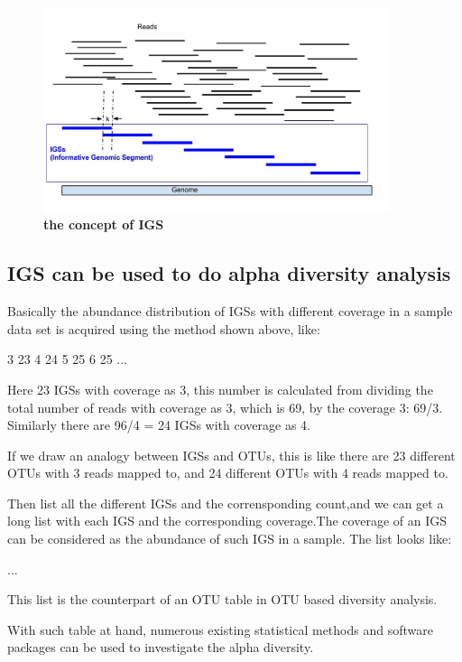 \documentclass{article}
\begin{document}
\begin{figure}[!ht]
\centerline{\includegraphics[width=4in]{./figures/IGSs_figure.jpg}}
\caption{\bf the concept of IGS}
\label{fig:IGS}
\end{figure}

\subsection{IGS can be used to do alpha diversity analysis}

Basically the abundance distribution of IGSs with different coverage in a sample data set is acquired using the method shown above, like:

    3 23
    4 24
    5 25
    6 25
    ...

Here 23 IGSs with coverage as 3, this number is calculated from dividing the total number of reads with coverage as 3, which is 69, by the coverage 3: 69/3. Similarly there are 96/4 = 24 IGSs with coverage as 4.

If we draw an analogy between IGSs and OTUs, this is like there are 23 different OTUs with 3 reads mapped to, and 24 different OTUs with 4 reads mapped to. 

Then list all the different IGSs and the corrensponding count,and we can get a long list with each IGS and the corresponding coverage.The coverage of an IGS can be considered as the abundance of such IGS in a sample. The list looks like:

    ...
  
This list is the counterpart of an OTU table in OTU based diversity analysis.

With such table at hand, numerous existing statistical methods and software packages can be used to investigate the alpha diversity.  
\end{document}

